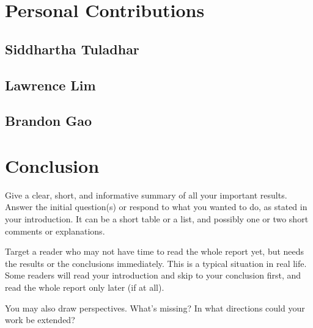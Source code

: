 \documentclass{scrartcl}
\begin{document}
\section{Personal Contributions}

\subsection{Siddhartha Tuladhar}

\subsection{Lawrence Lim}

\subsection{Brandon Gao}

\section{Conclusion}

Give a clear, short, and informative summary of all your important results. Answer the initial question(s) or respond to what you wanted to do, as stated in your introduction. It can be a short table or a list, and possibly one or two short comments or explanations.

Target a reader who may not have time to read the whole report yet, but needs the results or the conclusions immediately. This is a typical situation in real life. Some readers will read your introduction and skip to your conclusion first, and read the whole report only later (if at all).

You may also draw perspectives. What's missing? In what directions could your work be extended?

\newpage
\singlespacing




\end{document}
